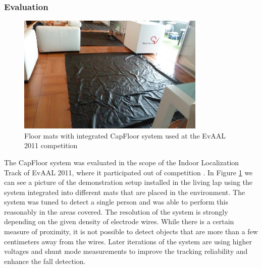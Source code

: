 \subsubsection{Evaluation}
\begin{figure}[h]
\centering
\includegraphics[width=0.8\textwidth]{images/capfloor_evaal}
\caption{Floor mats with integrated CapFloor system used at the EvAAL 2011 competition \cite{Braun2012CapFloor}}
\label{fig:capfloor_evaal}
\end{figure}
The CapFloor system was evaluated in the scope of the Indoor Localization Track of EvAAL 2011, where it participated out of competition \cite{chessa_eval}. In Figure \ref{fig:capfloor_evaal} we can see a picture of the demonstration setup installed in the living lap using the system integrated into different mats that are placed in the environment. The system was tuned to detect a single person and was able to perform this reasonably in the areas covered. The resolution of the system is strongly depending on the given density of electrode wires. While there is a certain measure of proximity, it is not possible to detect objects that are more than a few centimeters away from the wires. Later iterations of the system are using higher voltages and shunt mode measurements to improve the tracking reliability and enhance the fall detection.
